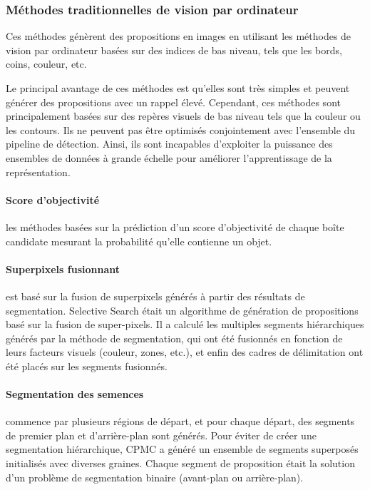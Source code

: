           \subsubsection{Méthodes traditionnelles de vision par ordinateur}
          Ces méthodes génèrent des propositions en images en utilisant les méthodes de vision par ordinateur basées sur des indices de bas niveau, tels que les bords, coins, couleur, etc. 

          Le principal avantage de ces méthodes est qu'elles sont très simples et peuvent générer des propositions avec un rappel élevé. Cependant, ces méthodes sont principalement basées sur des repères visuels de bas niveau tels que la couleur ou les contours. Ils ne peuvent pas être optimisés conjointement avec l'ensemble du pipeline de détection. Ainsi, ils sont incapables d'exploiter la puissance des ensembles de données à grande échelle pour améliorer l'apprentissage de la représentation.

          \paragraph{Score d'objectivité} les méthodes basées sur la prédiction d'un score d'objectivité de chaque boîte candidate mesurant la probabilité qu'elle contienne un objet.
          \paragraph{Superpixels fusionnant} est basé sur la fusion de superpixels générés à partir des résultats de segmentation. Selective Search \cite{selctive_search_paper} était un algorithme de génération de propositions basé sur la fusion de super-pixels. Il a calculé les multiples segments hiérarchiques générés par la méthode de segmentation, qui ont été fusionnés en fonction de leurs facteurs visuels (couleur, zones, etc.), et enfin des cadres de délimitation ont été placés sur les segments fusionnés.
          \paragraph{Segmentation des semences} commence par plusieurs régions de départ, et pour chaque départ, des segments de premier plan et d'arrière-plan sont générés. Pour éviter de créer une segmentation hiérarchique, CPMC \cite{cpmc_paper} a généré un ensemble de segments superposés initialisés avec diverses graines. Chaque segment de proposition était la solution d'un problème de segmentation binaire (avant-plan ou arrière-plan).

